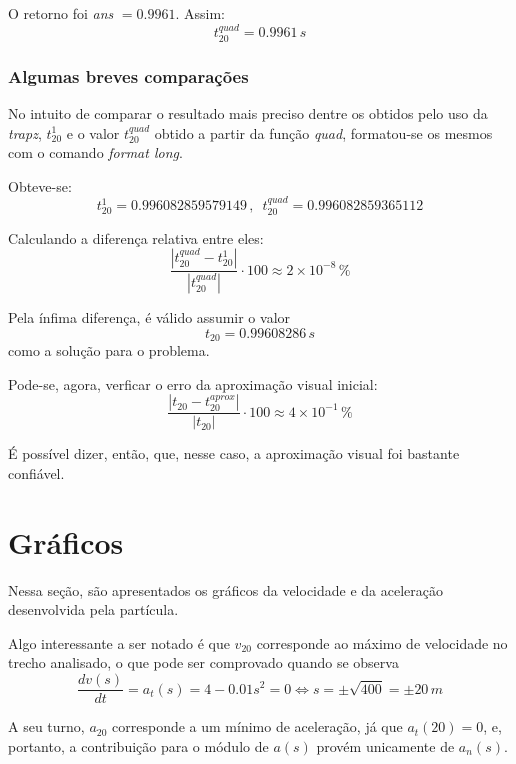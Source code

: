\documentclass[a4paper, 12pt]{article}
\begin{document}
	O retorno foi \textit{ans} $=0.9961$. Assim: $$t_{20}^{quad}=0.9961\,s$$
	
	\newpage
	
	\subsubsection{Algumas breves comparações}
	
	No intuito de comparar o resultado mais preciso dentre os obtidos pelo uso da \textit{trapz}, $t_{20}^1$ e o valor 
	$t_{20}^{quad}$ obtido a partir da função \textit{quad}, formatou-se os mesmos com o comando \textit{format long}.	
	
	Obteve-se: $$t_{20}^1=0.996082859579149\,,\,\,\,t_{20}^{quad}=0.996082859365112$$
	
	Calculando a diferença relativa entre eles: $$\frac{|t_{20}^{quad}-t_{20}^1|}{|t_{20}^{quad}|}\cdot 100\approx 
	2\times 10^{-8}\,\%$$
	
	Pela ínfima diferença, é válido assumir o valor $$t_{20}=0.99608286\,s$$ como a solução para o problema.
	
	Pode-se, agora, verficar o erro da aproximação visual inicial: $$\frac{|t_{20}-t_{20}^{aprox}|}{|t_{20}|}\cdot 100
	\approx 4\times 10^{-1}\,\%$$
	
	É possível dizer, então, que, nesse caso, a aproximação visual foi bastante confiável.
	
	\section{Gráficos}
	
	Nessa seção, são apresentados os gráficos da velocidade e da aceleração desenvolvida pela partícula.
	
	Algo interessante a ser notado é que $v_{20}$ corresponde ao máximo de velocidade no trecho analisado, o que pode ser
	comprovado quando se observa $$\frac{dv(s)}{dt}=a_t(s)=4-0.01s^2=0\Longleftrightarrow s=\pm \sqrt{400}=\pm 20\,m$$
	
	A seu turno, $a_{20}$ corresponde a um mínimo de aceleração, já que $a_t(20)=0$, e, portanto, a contribuição para o
	módulo de $a(s)$ provém unicamente de $a_n(s)$.
	
\end{document}
